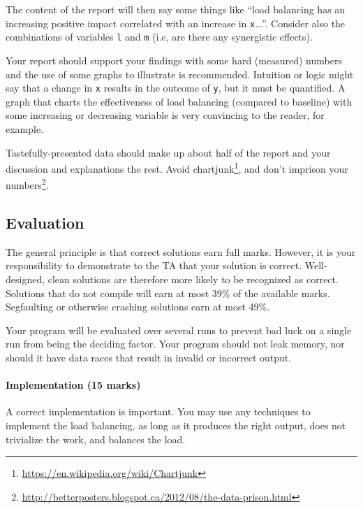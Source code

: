 \documentclass[letterpaper,10pt]{article}
\begin{document}
The content of the report will then say some things like ``load balancing has an increasing positive impact correlated with an increase in \texttt{x}...''. Consider also the combinations of variables \texttt{l} and \texttt{m} (i.e, are there any synergistic effects).

Your report should support your findings with some hard (measured) numbers and the use of some graphs to illustrate is recommended. Intuition or logic might say that a change in \texttt{x} results in the outcome of \texttt{y}, but it must be quantified. A graph that charts the effectiveness of load balancing (compared to baseline) with some increasing or decreasing variable is very convincing to the reader, for example.

Tastefully-presented data should make up about half of the report and your discussion and explanations the rest. Avoid chartjunk\footnote{\url{https://en.wikipedia.org/wiki/Chartjunk}}, and don't imprison your numbers\footnote{\url{http://betterposters.blogspot.ca/2012/08/the-data-prison.html}}.

\subsection{Evaluation}

The general principle is that correct solutions earn full marks.
However, it is your responsibility to demonstrate to the TA
that your solution is correct. Well-designed, clean solutions 
are therefore more likely to be recognized as correct. Solutions that do not compile will earn at most 39\% of the available
marks. Segfaulting or otherwise crashing solutions earn
at most 49\%.

Your program will be evaluated over several runs to prevent bad luck on a single run from being the deciding factor. Your program should not leak memory, nor should it have data races that result in invalid or incorrect output. 


\paragraph{Implementation (15 marks)} A correct implementation is important. You may use any techniques to implement the load balancing, as long as it produces the right output, does not trivialize the work, and balances the load.

\end{document}

